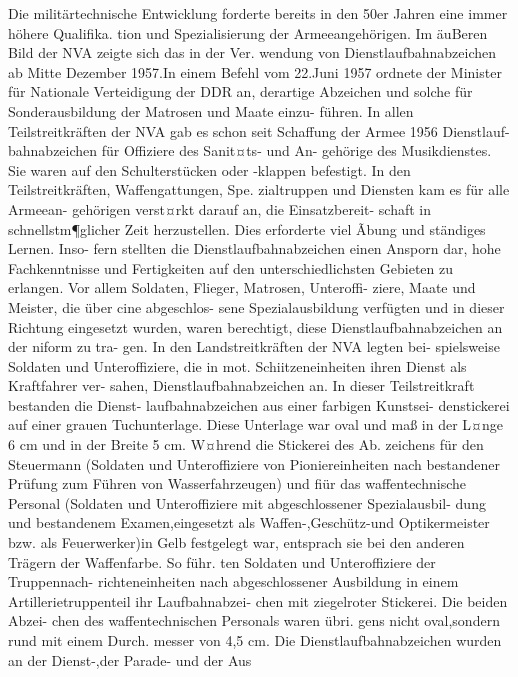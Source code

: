 

Die militärtechnische Entwicklung forderte bereits
in den 50er Jahren eine immer höhere Qualifika.
tion und Spezialisierung der Armeeangehörigen. Im
äuBeren Bild der NVA zeigte sich das in der Ver.
wendung von Dienstlaufbahnabzeichen ab Mitte
Dezember 1957.In einem Befehl vom 22.Juni 1957
ordnete der Minister für Nationale Verteidigung
der DDR an, derartige Abzeichen und solche für
Sonderausbildung der Matrosen und Maate einzu-
führen. In allen Teilstreitkräften der NVA gab es
schon seit Schaffung der Armee 1956 Dienstlauf-
bahnabzeichen für Offiziere des Sanit¤ts- und An-
gehörige des Musikdienstes. Sie waren auf den
Schulterstücken oder -klappen befestigt.
In den Teilstreitkräften, Waffengattungen, Spe.
zialtruppen und Diensten kam es für alle Armeean-
gehörigen verst¤rkt darauf an, die Einsatzbereit-
schaft in schnellstm¶glicher Zeit herzustellen. Dies
erforderte viel Ãbung und ständiges Lernen. Inso-
fern stellten die Dienstlaufbahnabzeichen einen Ansporn dar, hohe Fachkenntnisse und Fertigkeiten
auf den unterschiedlichsten Gebieten zu erlangen.
Vor allem Soldaten, Flieger, Matrosen, Unteroffi-
ziere, Maate und Meister, die über cine abgeschlos-
sene Spezialausbildung verfügten und in dieser
Richtung eingesetzt wurden, waren berechtigt, diese
Dienstlaufbahnabzeichen an der niform zu tra-
gen. In den Landstreitkräften der NVA legten bei-
spielsweise Soldaten und Unteroffiziere, die in mot.
Schiitzeneinheiten ihren Dienst als Kraftfahrer ver-
sahen, Dienstlaufbahnabzeichen an.
In dieser Teilstreitkraft bestanden die Dienst-
laufbahnabzeichen aus einer farbigen Kunstsei-
denstickerei auf einer grauen Tuchunterlage. Diese
Unterlage war oval und maß in der L¤nge 6 cm und
in der Breite 5 cm. W¤hrend die Stickerei des Ab.
zeichens für den Steuermann (Soldaten und Unteroffiziere von Pioniereinheiten nach bestandener
Prüfung zum Führen von Wasserfahrzeugen) und
fiür das waffentechnische Personal (Soldaten und
Unteroffiziere mit abgeschlossener Spezialausbil-
dung und bestandenem Examen,eingesetzt als
Waffen-,Geschütz-und Optikermeister bzw. als
Feuerwerker)in Gelb festgelegt war, entsprach sie
bei den anderen Trägern der Waffenfarbe. So führ.
ten Soldaten und Unteroffiziere der Truppennach-
richteneinheiten nach abgeschlossener Ausbildung
in einem Artillerietruppenteil ihr Laufbahnabzei-
chen mit ziegelroter Stickerei. Die beiden Abzei-
chen des waffentechnischen Personals waren übri.
gens nicht oval,sondern rund mit einem Durch.
messer von 4,5 cm. Die Dienstlaufbahnabzeichen
wurden an der Dienst-,der Parade- und der Aus
